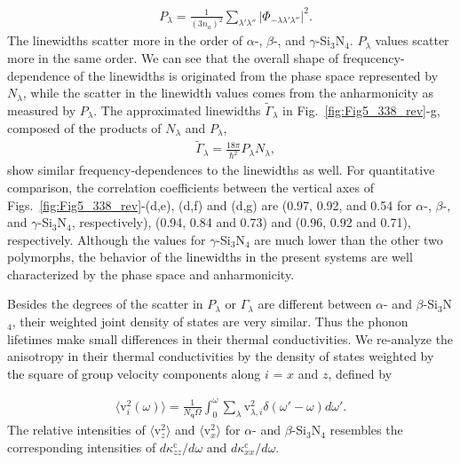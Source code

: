 \documentclass[twocolumn,amsmath,amssymb,a4paper,prb,superscriptaddress,floatfix]{revtex4-1}
\begin{document}
\begin{align}
 \label{eq:avepp}
 &P_\lambda = \frac{1}{(3n_a)^2}
  \sum_{\lambda' \lambda''}
  \bigl|\Phi_{-\lambda\lambda'\lambda''}\bigl|^2. 
\end{align}
The linewidths scatter more in the order of $\alpha$-, $\beta$-, and
$\gamma$-Si$_3$N$_4$.
$P_\lambda$ values scatter more in the same order. 
We can see that the overall shape of frequcency-dependence of the linewidths is
originated from the phase space represented by $N_\lambda$, while the scatter in
the linewidth values comes from the anharmonicity as measured by $P_\lambda$.
The approximated linewidths $\tilde{\Gamma}_\lambda$ in
Fig.~\ref{fig:Fig5_338_rev}-g, composed of the products of $N_\lambda$ and
$P_\lambda$, 
\begin{align}
 \label{eq:tildegamma}
 &\tilde{\Gamma}_\lambda = \frac{18\pi}{\hbar^2}
 P_{\lambda}N_{\lambda},
\end{align}
show similar frequency-dependences to the linewidths as well. 
For quantitative comparison, the correlation coefficients between the vertical
axes of Figs.~\ref{fig:Fig5_338_rev}-(d,e), (d,f) and (d,g) are (0.97, 0.92,
and 0.54 for $\alpha$-, $\beta$-, and 
$\gamma$-Si$_3$N$_4$, respectively), (0.94, 0.84 and 0.73) and (0.96, 0.92 and
0.71), respectively. Although the values for $\gamma$-Si$_3$N$_4$ are much lower
than the other two polymorphs, the behavior of the linewidths in the present
systems are well characterized by the phase space and anharmonicity. 

Besides the degrees of the scatter in $P_\lambda$ or $\Gamma_\lambda$ are
different between $\alpha$- and $\beta$-Si$_3$N$_4$, their weighted joint
density of states are very similar. Thus the phonon lifetimes make small
differences in their thermal conductivities. 
We re-analyze the anisotropy in their thermal conductivities by the density of
states weighted by the square of group velocity components along $i$ = $x$ and
$z$,
defined by 

\begin{align}
 \label{eq:v2dos}
 \langle\text{v}^2_i(\omega)\rangle = \frac{1}{N_\mathbf{q}\Omega}
 \int_0^\omega \sum_\lambda
 \text{v}_{\lambda,i}^2\delta(\omega'-\omega)d\omega'.
\end{align}
The relative intensities of $\langle\text{v}^2_z\rangle$ and
$\langle\text{v}^2_x\rangle$ for $\alpha$- and $\beta$-Si$_3$N$_4$ resembles
the corresponding intensities of $d\kappa^\text{c}_{zz}/d\omega$ and
$d\kappa^\text{c}_{xx}/d\omega$. 
\end{document}
